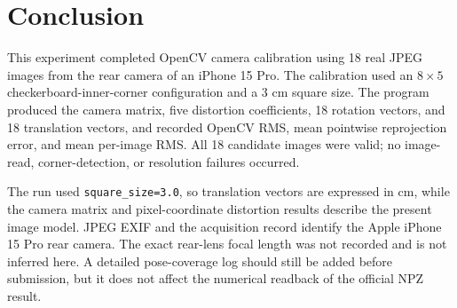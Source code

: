 \section{Conclusion}\label{sec:task2-conclusion}

This experiment completed OpenCV camera calibration using 18 real JPEG images from the rear camera of an iPhone 15 Pro. The calibration used an \(8\times5\) checkerboard-inner-corner configuration and a 3 cm square size. The program produced the camera matrix, five distortion coefficients, 18 rotation vectors, and 18 translation vectors, and recorded OpenCV RMS, mean pointwise reprojection error, and mean per-image RMS. All 18 candidate images were valid; no image-read, corner-detection, or resolution failures occurred.

The run used \texttt{square\_size=3.0}, so translation vectors are expressed in cm, while the camera matrix and pixel-coordinate distortion results describe the present image model. JPEG EXIF and the acquisition record identify the Apple iPhone 15 Pro rear camera. The exact rear-lens focal length was not recorded and is not inferred here. A detailed pose-coverage log should still be added before submission, but it does not affect the numerical readback of the official NPZ result.
